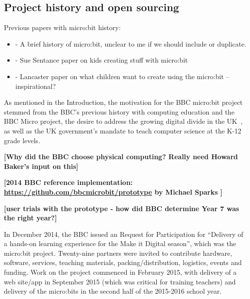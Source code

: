 


\subsection{Project history and open sourcing}


Previous papers with micro:bit history:

\begin{itemize}
    \item \cite{rogers2017bbc} - A brief history of micro:bit, unclear to me if we should include or duplicate.
    \item \cite{sentance2017creating} - Sue Sentance paper on kids creating stuff with micro:bit
    \item \cite{knowles2018children} - Lancaster paper on what children want to create using the micro:bit -- inspirational?
\end{itemize}

As mentioned in the Introduction, the motivation for the BBC micro:bit project
stemmed from the BBC's previous history with computing education and the BBC Micro
project, the desire to address the growing digital divide in the UK~\cite{XYZ},
as well as the UK government's mandate to teach computer science at the K-12 grade levels.

{\bf [Why did the BBC choose physical computing? Really need Howard Baker's input on this]}

{\bf [2014 BBC reference implementation: \url{https://github.com/bbcmicrobit/prototype}
by Michael Sparks ]}

{\bf [user trials with the prototype - how did BBC determine Year 7 was the right year?] }

In December 2014, the BBC issued an Request for Participation
for ``Delivery of a hands-on learning experience for the Make it Digital season'',
which was the micro:bit project.
Twenty-nine partners were invited to contribute hardware, software, services,
teaching materials, packing/distribution, logistics, events and funding.
Work on the project commenced in February 2015, with delivery of
a web site/app in September 2015 (which was critical
for training teachers) and delivery of the micro:bits in the second
half of the 2015-2016 school year.

